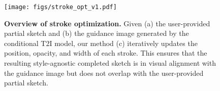 \begin{figure}[!t]
  \centering
  \texttt{[image: figs/stroke\_opt\_v1.pdf]}
  \caption{
\textbf{Overview of stroke optimization.} 
Given (a) the user-provided partial sketch and (b) the guidance image generated by the conditional T2I model, our method (c) iteratively updates the position, opacity, and width of each stroke.
This ensures that the resulting style-agnostic completed sketch is in visual alignment with the guidance image but does not overlap with the user-provided partial sketch. 
}
  \label{fig:stroke_opt}
\end{figure}
